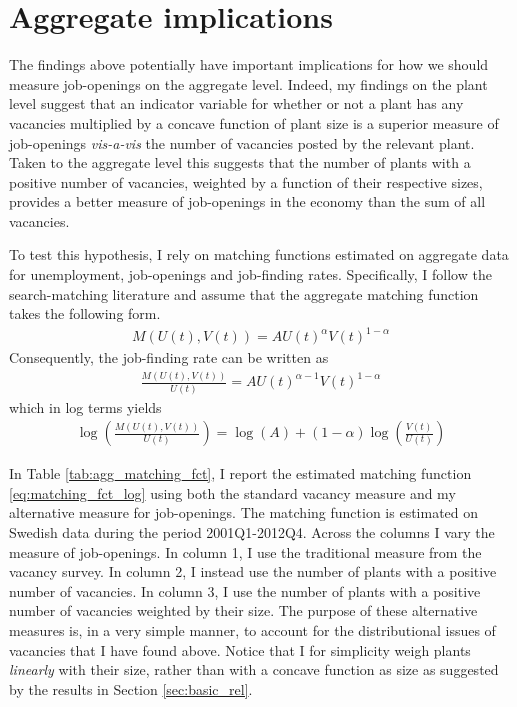 \section{Aggregate implications}
\label{sec:agg_implications}

The findings above potentially have important implications for how we should measure job-openings on the aggregate level. Indeed, my findings on the plant level suggest that an indicator variable for whether or not a plant has any vacancies multiplied by a concave function of plant size is a superior measure of job-openings \emph{vis-a-vis} the number of vacancies posted by the relevant plant. Taken to the aggregate level this suggests that the number of plants with a positive number of vacancies, weighted by a function of their respective sizes, provides a better measure of job-openings in the economy than the sum of all vacancies. 

To test this hypothesis, I rely on matching functions estimated on aggregate data for unemployment, job-openings and job-finding rates. Specifically, I follow the search-matching literature and assume that the aggregate matching function takes the following form. 
\begin{align}
M(U(t), V(t))=AU(t)^{\alpha}V(t)^{1-\alpha}
\end{align}
Consequently, the job-finding rate can be written as
\begin{align}
\frac{M(U(t), V(t))}{U(t)}=AU(t)^{\alpha-1} V(t)^{1-\alpha}
\end{align}
which in log terms yields
\begin{align}
\log\left(\frac{M(U(t), V(t))}{U(t)}\right) =\log(A)+\left(1-\alpha\right)\log\left(\frac{V(t)}{U(t)}\right) \label{eq:matching_fct_log}
\end{align}

In Table \ref{tab:agg_matching_fct}, I report the estimated matching function \eqref{eq:matching_fct_log} using both the standard vacancy measure and my alternative measure for job-openings. The matching function is estimated on Swedish data during the period 2001Q1-2012Q4. Across the columns I vary the measure of job-openings. In column 1, I use the traditional measure from the vacancy survey. In column 2, I instead use the number of plants with a positive number of vacancies. In column 3, I use the number of plants with a positive number of vacancies weighted by their size. The purpose of these alternative measures is, in a very simple manner, to account for the distributional issues of vacancies that I have found above. Notice that I for simplicity weigh plants \emph{linearly} with their size, rather than with a concave function as size as suggested by the results in Section \ref{sec:basic_rel}.

